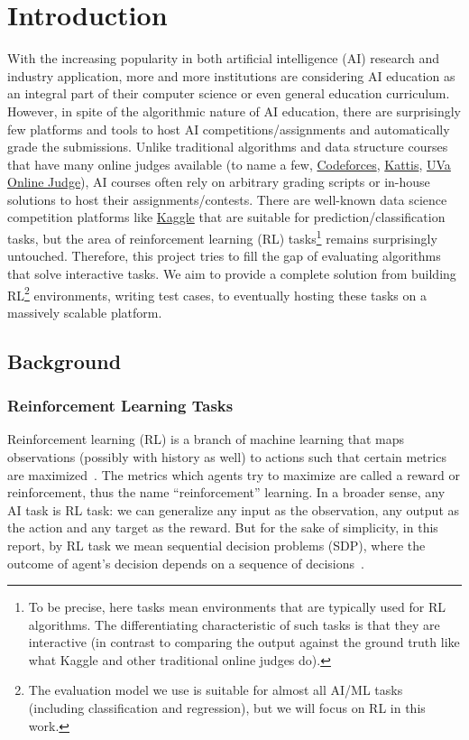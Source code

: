 \chapter{Introduction}

With the increasing popularity in both artificial intelligence (AI) research and industry application, more and more institutions are considering AI education as an integral part of their computer science or even general education curriculum. However, in spite of the algorithmic nature of AI education, there are surprisingly few platforms and tools to host AI competitions/assignments and automatically grade the submissions. Unlike traditional algorithms and data structure courses that have many online judges available (to name a few, \href{https://codeforces.com/}{Codeforces}, \href{https://open.kattis.com/}{Kattis}, \href{https://onlinejudge.org/}{UVa Online Judge}), AI courses often rely on arbitrary grading scripts or in-house solutions to host their assignments/contests. There are well-known data science competition platforms like \href{https://www.kaggle.com/}{Kaggle} that are suitable for prediction/classification tasks, but the area of reinforcement learning (RL) tasks\footnote{To be precise, here tasks mean environments that are typically used for RL algorithms. The differentiating characteristic of such tasks is that they are interactive (in contrast to comparing the output against the ground truth like what Kaggle and other traditional online judges do).} remains surprisingly untouched. Therefore, this project tries to fill the gap of evaluating algorithms that solve interactive tasks. We aim to provide a complete solution from building RL\footnote{The evaluation model we use is suitable for almost all AI/ML tasks (including classification and regression), but we will focus on RL in this work.} environments, writing test cases, to eventually hosting these tasks on a massively scalable platform.

\section{Background}
\subsection{Reinforcement Learning Tasks}
Reinforcement learning (RL) is a branch of machine learning that maps observations (possibly with history as well) to actions such that certain metrics are maximized~\parencite{sutton-barto}. The metrics which agents try to maximize are called a reward or reinforcement, thus the name ``reinforcement'' learning. In a broader sense, any AI task is RL task: we can generalize any input as the observation, any output as the action and any target as the reward. But for the sake of simplicity, in this report, by RL task we mean sequential decision problems (SDP), where the outcome of agent’s decision depends on a sequence of decisions~\parencite{russell}.


